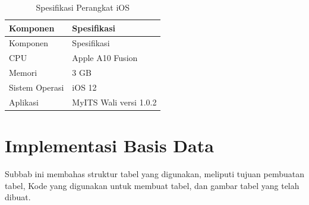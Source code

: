 \begin{longtable}{|p{3cm}|p{6.5cm}|}
	\caption{Spesifikasi Perangkat iOS} \label{tabel_spesifikasi_perangkat_ios} \\ \hline
	\rowcolor{lightgray} Komponen & Spesifikasi \\ \hline
	\endfirsthead
	\hline
	\rowcolor{lightgray} Komponen & Spesifikasi \\ \hline
	\endhead
	CPU & Apple A10 Fusion \\ \hline
	Memori & 3 GB \\ \hline
	Sistem Operasi & iOS 12 \\ \hline
	Aplikasi & MyITS Wali versi 1.0.2 \\ \hline
\end{longtable}

\section{Implementasi Basis Data}
\par Subbab ini membahas struktur tabel yang digunakan, meliputi tujuan pembuatan tabel, Kode yang digunakan untuk membuat tabel, dan gambar tabel yang telah dibuat.

%

